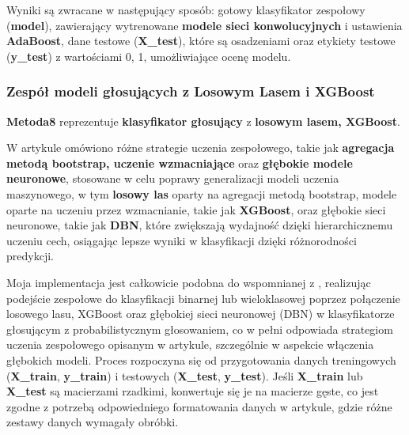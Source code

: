 Wyniki są zwracane w następujący sposób: gotowy klasyfikator zespołowy (\textbf{model}), zawierający wytrenowane \textbf{modele sieci konwolucyjnych} i ustawienia \textbf{AdaBoost}, dane testowe (\textbf{X\_test}), które są osadzeniami oraz etykiety testowe (\textbf{y\_test}) z wartościami 0, 1, umożliwiające ocenę modelu.

\subsubsection{Zespół modeli głosujących z Losowym Lasem i XGBoost}
\textbf{Metoda8} reprezentuje \textbf{klasyfikator głosujący} z \textbf{losowym lasem, XGBoost}.

W artykule \cite{metoda8} omówiono różne strategie uczenia zespołowego, takie jak \textbf{agregacja metodą bootstrap, uczenie wzmacniające} oraz \textbf{głębokie modele neuronowe}, stosowane w celu poprawy generalizacji modeli uczenia maszynowego, w tym \textbf{losowy las} oparty na agregacji metodą bootstrap, modele oparte na uczeniu przez wzmacnianie, takie jak \textbf{XGBoost}, oraz głębokie sieci neuronowe, takie jak \textbf{DBN}, które zwiększają wydajność dzięki hierarchicznemu uczeniu cech, osiągając lepsze wyniki w klasyfikacji dzięki różnorodności predykcji.

Moja implementacja jest całkowicie podobna do wspomnianej z \cite{metoda8}, realizując podejście zespołowe do klasyfikacji binarnej lub wieloklasowej poprzez połączenie losowego lasu, XGBoost oraz głębokiej sieci neuronowej (DBN) w klasyfikatorze głosującym z probabilistycznym głosowaniem, co w pełni odpowiada strategiom uczenia zespołowego opisanym w artykule, szczególnie w aspekcie włączenia głębokich modeli. Proces rozpoczyna się od przygotowania danych treningowych (\textbf{X\_train}, \textbf{y\_train}) i testowych (\textbf{X\_test}, \textbf{y\_test}). Jeśli \textbf{X\_train} lub \textbf{X\_test} są macierzami rzadkimi, konwertuje się je na macierze gęste, co jest zgodne z potrzebą odpowiedniego formatowania danych w artykule, gdzie różne zestawy danych wymagały obróbki.

